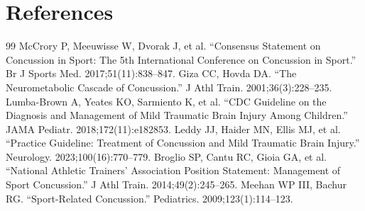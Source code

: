 \section*{References}
\begin{thebibliography}{99}
 McCrory P, Meeuwisse W, Dvorak J, et al. ``Consensus Statement on Concussion in Sport: The 5th International Conference on Concussion in Sport.'' Br J Sports Med. 2017;51(11):838--847.
 Giza CC, Hovda DA. ``The Neurometabolic Cascade of Concussion.'' J Athl Train. 2001;36(3):228--235.
 Lumba-Brown A, Yeates KO, Sarmiento K, et al. ``CDC Guideline on the Diagnosis and Management of Mild Traumatic Brain Injury Among Children.'' JAMA Pediatr. 2018;172(11):e182853.
 Leddy JJ, Haider MN, Ellis MJ, et al. ``Practice Guideline: Treatment of Concussion and Mild Traumatic Brain Injury.'' Neurology. 2023;100(16):770--779.
 Broglio SP, Cantu RC, Gioia GA, et al. ``National Athletic Trainers' Association Position Statement: Management of Sport Concussion.'' J Athl Train. 2014;49(2):245--265.
 Meehan WP III, Bachur RG. ``Sport-Related Concussion.'' Pediatrics. 2009;123(1):114--123.
\end{thebibliography}
